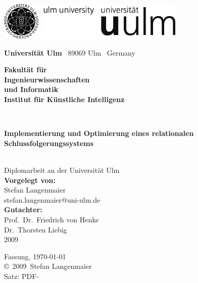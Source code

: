 \documentclass[a4paper,
bibtotoc,twoside,openright,pointlessnumbers,normalheadings,DIV=9
]{scrbook}
\makeatletter
\newcommand{\fullname}{Stefan Langenmaier}
\newcommand{\email}{stefan.langenmaier@uni-ulm.de}
\newcommand{\titel}{Implementierung und Optimierung eines relationalen Schlussfolgerungssystems}
\newcommand{\jahr}{2009}
\newcommand{\gutachterA}{Prof.~Dr.~Friedrich von Henke}
\newcommand{\gutachterB}{Dr.~Thorsten Liebig}
\newcommand{\betreuer}{Dr.~Thorsten Liebig}
\newcommand{\fakultaet}{Ingenieurwissenschaften\\und Informatik}
\newcommand{\institut}{Institut für Künstliche Intelligenz}
\makeatother
\begin{document}
\frontmatter

\thispagestyle{empty}
\begin{addmargin*}[4mm]{-32mm}

\includegraphics[height=1.8cm]{images/unilogo_bild}
\hfill
\includegraphics[height=1.8cm]{images/unilogo_wort}\\[1em]

{\footnotesize
{\bfseries Universität Ulm} \textbar ~89069 Ulm \textbar ~Germany
\hspace*{60mm}\parbox[t]{48mm}{\bfseries Fakultät für\\
\fakultaet\\
\mdseries \institut}\\[2cm]

\parbox{140mm}{\bfseries \huge \titel}\\[0.5em]
{\footnotesize Diplomarbeit an der Universität Ulm}\\[3em]

{\footnotesize \bfseries Vorgelegt von:}\\
{\footnotesize \fullname\\\email}\\[2em]
{\footnotesize \bfseries Gutachter:}\\                     
{\footnotesize\gutachterA\\
\gutachterB}\\[2em]
{\footnotesize\jahr}
}
\end{addmargin*}


\clearpage
\thispagestyle{empty}
{ \small
  \flushleft
  Fassung, \today \\\vfill
  \copyright~\jahr~\fullname\\[0.5em]

  Satz: PDF-\LaTeXe
}
\end{document}
